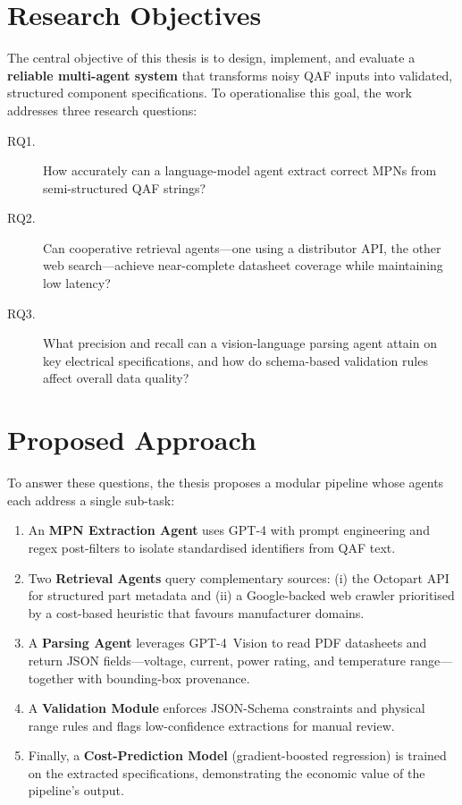 \section{Research Objectives}
The central objective of this thesis is to design, implement, and evaluate a \textbf{reliable multi-agent system} that transforms noisy QAF inputs into validated, structured component specifications.  
To operationalise this goal, the work addresses three research questions:

\begin{description}
  \item[RQ1.] How accurately can a language-model agent extract correct MPNs from semi-structured QAF strings?
  \item[RQ2.] Can cooperative retrieval agents—one using a distributor API, the other web search—achieve near-complete datasheet coverage while maintaining low latency?
  \item[RQ3.] What precision and recall can a vision-language parsing agent attain on key electrical specifications, and how do schema-based validation rules affect overall data quality?
\end{description}

\section{Proposed Approach}
To answer these questions, the thesis proposes a modular pipeline whose agents each address a single sub-task:  
\begin{enumerate}
  \item An \textbf{MPN Extraction Agent} uses GPT-4 with prompt engineering and regex post-filters to isolate standardised identifiers from QAF text.  
  \item Two \textbf{Retrieval Agents} query complementary sources: (i) the Octopart API for structured part metadata and (ii) a Google-backed web crawler prioritised by a cost-based heuristic that favours manufacturer domains.  
  \item A \textbf{Parsing Agent} leverages GPT-4~Vision to read PDF datasheets and return JSON fields—voltage, current, power rating, and temperature range—together with bounding-box provenance.  
  \item A \textbf{Validation Module} enforces JSON-Schema constraints and physical range rules and flags low-confidence extractions for manual review.  
  \item Finally, a \textbf{Cost-Prediction Model} (gradient-boosted regression) is trained on the extracted specifications, demonstrating the economic value of the pipeline’s output.
\end{enumerate}

